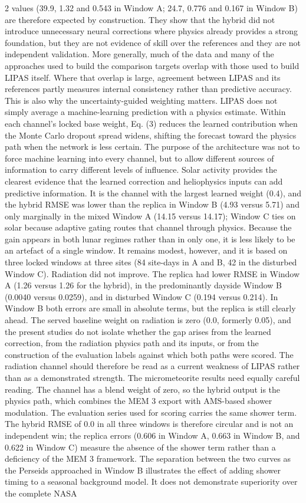 \begin{multicols}{2}
values (39.9, 1.32 and 0.543 in Window A; 24.7, 0.776 and 0.167 in Window B) are therefore expected by construction. They show that the hybrid did not introduce unnecessary neural corrections where physics already provides a strong foundation, but they are not evidence of skill over the references and they are not independent validation. More generally, much of the data and many of the approaches used to build the comparison targets overlap with those used to build LIPAS itself. Where that overlap is large, agreement between LIPAS and its references partly measures internal consistency rather than predictive accuracy. This is also why the uncertainty-guided weighting matters. LIPAS does not simply average a machine-learning prediction with a physics estimate. Within each channel's locked base weight, Eq. (3) reduces the learned contribution when the Monte Carlo dropout spread widens, shifting the forecast toward the physics path when the network is less certain. The purpose of the architecture was not to force machine learning into every channel, but to allow different sources of information to carry different levels of influence. Solar activity provides the clearest evidence that the learned correction and heliophysics inputs can add predictive information. It is the channel with the largest learned weight (0.4), and the hybrid RMSE was lower than the replica in Window B (4.93 versus 5.71) and only marginally in the mixed Window A (14.15 versus 14.17); Window C ties on solar because adaptive gating routes that channel through physics. Because the gain appears in both lunar regimes rather than in only one, it is less likely to be an artefact of a single window. It remains modest, however, and it is based on three locked windows at three sites (84 site-days in A and B, 42 in the disturbed Window C). Radiation did not improve. The replica had lower RMSE in Window A (1.26 versus 1.26 for the hybrid), in the predominantly dayside Window B (0.0040 versus 0.0259), and in disturbed Window C (0.194 versus 0.214). In Window B both errors are small in absolute terms, but the replica is still clearly ahead. The served baseline weight on radiation is zero (0.0, formerly 0.05), and the present studies do not isolate whether the gap arises from the learned correction, from the radiation physics path and its inputs, or from the construction of the evaluation labels against which both paths were scored. The radiation channel should therefore be read as a current weakness of LIPAS rather than as a demonstrated strength. The micrometeorite results need equally careful reading. The channel has a blend weight of zero, so the hybrid output is the physics path, which combines the MEM 3 export with AMS-based shower modulation. The evaluation series used for scoring carries the same shower term. The hybrid RMSE of 0.0 in all three windows is therefore circular and is not an independent win; the replica errors (0.606 in Window A, 0.663 in Window B, and 0.622 in Window C) measure the absence of the shower term rather than a deficiency of the MEM 3 framework. The separation between the two curves as the Perseids approached in Window B illustrates the effect of adding shower timing to a seasonal background model. It does not demonstrate superiority over the complete NASA 
\end{multicols}
